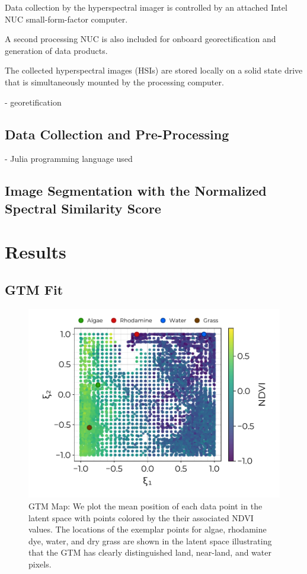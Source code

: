 \documentclass[remotesensing,article,submit,pdftex,moreauthors]{Definitions/mdpi}
\begin{document}
Data collection by the hyperspectral imager is controlled by an attached Intel NUC small-form-factor computer. 

A second processing NUC is also included for onboard georectification and generation of data products.

The collected hyperspectral images (HSIs) are stored locally on a solid state drive that is simultaneously mounted by the processing computer.

- georetification \cite{muller2002program, baumker2001new, mostafa2000multi}

\subsection{Data Collection and Pre-Processing}
- Julia programming language used \cite{bezanson2012julia}



\subsection{Image Segmentation with the Normalized Spectral Similarity Score}


\section{Results}

\subsection{GTM Fit}

\begin{figure}[t]
\centering
\includegraphics[width=0.8\columnwidth]{paper/figures/results/square-ndvi.pdf}
\caption{GTM Map: We plot the mean position of each data point in the latent space with points colored by the their associated NDVI values. The locations of the exemplar points for algae, rhodamine dye, water, and dry grass are shown in the latent space illustrating that the GTM has clearly distinguished land, near-land, and water pixels.\label{fig:}}
\end{figure}  
\end{document}
